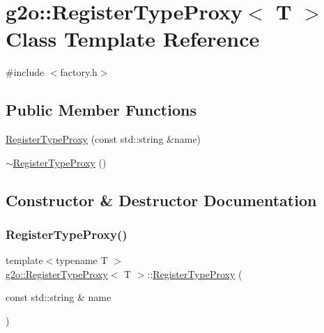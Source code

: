 \hypertarget{classg2o_1_1_register_type_proxy}{}\section{g2o\+:\+:Register\+Type\+Proxy$<$ T $>$ Class Template Reference}
\label{classg2o_1_1_register_type_proxy}


{\ttfamily \#include $<$factory.\+h$>$}

\subsection*{Public Member Functions}
\begin{DoxyCompactItemize}
\item 
\mbox{\hyperlink{classg2o_1_1_register_type_proxy_a179d0d498d8a53f9432d1635019705f5}{Register\+Type\+Proxy}} (const std\+::string \&name)
\item 
\mbox{\hyperlink{classg2o_1_1_register_type_proxy_ab8469d11a8e3548e74b1de4b3a332d4e}{$\sim$\+Register\+Type\+Proxy}} ()
\end{DoxyCompactItemize}


\subsection{Constructor \& Destructor Documentation}
\mbox{\label{classg2o_1_1_register_type_proxy_a179d0d498d8a53f9432d1635019705f5}} 
\subsubsection{\texorpdfstring{Register\+Type\+Proxy()}{RegisterTypeProxy()}}
{\footnotesize\ttfamily template$<$typename T $>$ \\
\mbox{\hyperlink{classg2o_1_1_register_type_proxy}{g2o\+::\+Register\+Type\+Proxy}}$<$ T $>$\+::\mbox{\hyperlink{classg2o_1_1_register_type_proxy}{Register\+Type\+Proxy}} (\begin{DoxyParamCaption}\item[{const std\+::string \&}]{name }\end{DoxyParamCaption})\hspace{0.3cm}{\ttfamily [inline]}}

